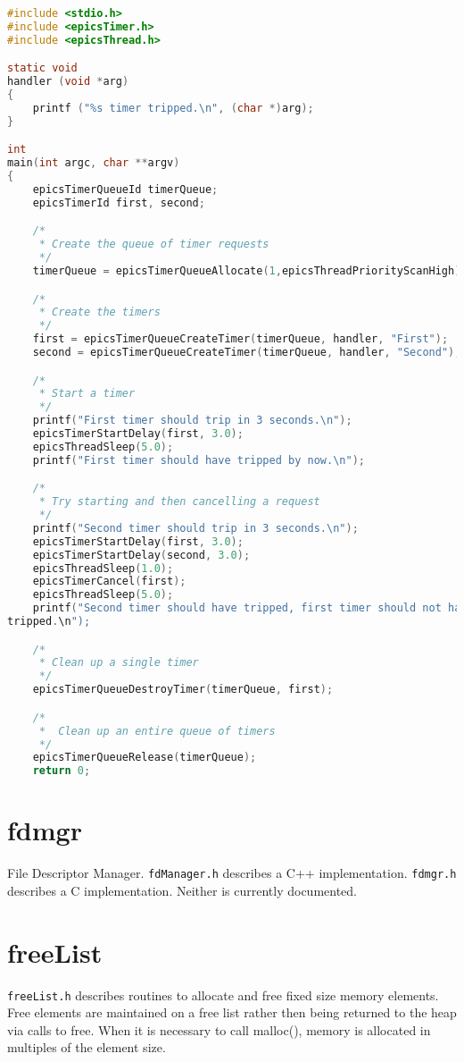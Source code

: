 \begin{lstlisting}[language=C]
#include <stdio.h>
#include <epicsTimer.h>
#include <epicsThread.h>

static void
handler (void *arg)
{
    printf ("%s timer tripped.\n", (char *)arg);
}

int
main(int argc, char **argv)
{
    epicsTimerQueueId timerQueue;
    epicsTimerId first, second;

    /*
     * Create the queue of timer requests
     */
    timerQueue = epicsTimerQueueAllocate(1,epicsThreadPriorityScanHigh);

    /*
     * Create the timers
     */
    first = epicsTimerQueueCreateTimer(timerQueue, handler, "First");
    second = epicsTimerQueueCreateTimer(timerQueue, handler, "Second");

    /*
     * Start a timer
     */
    printf("First timer should trip in 3 seconds.\n");
    epicsTimerStartDelay(first, 3.0);
    epicsThreadSleep(5.0);
    printf("First timer should have tripped by now.\n");

    /*
     * Try starting and then cancelling a request
     */
    printf("Second timer should trip in 3 seconds.\n");
    epicsTimerStartDelay(first, 3.0);
    epicsTimerStartDelay(second, 3.0);
    epicsThreadSleep(1.0);
    epicsTimerCancel(first);
    epicsThreadSleep(5.0);
    printf("Second timer should have tripped, first timer should not have 
tripped.\n");

    /*
     * Clean up a single timer
     */
    epicsTimerQueueDestroyTimer(timerQueue, first);

    /*
     *  Clean up an entire queue of timers
     */
    epicsTimerQueueRelease(timerQueue);
    return 0;
\end{lstlisting}

\section{  fdmgr}

File Descriptor Manager. \verb|fdManager.h| describes a C++ implementation. \verb|fdmgr.h| describes a C implementation. 
Neither is currently documented.

\section{freeList}

\verb|freeList.h| describes routines to allocate and free fixed size memory elements.   Free elements are maintained on a 
free list rather then being returned to the heap via calls to free. When it is necessary to call malloc(), memory is allocated 
in multiples of the element size.

